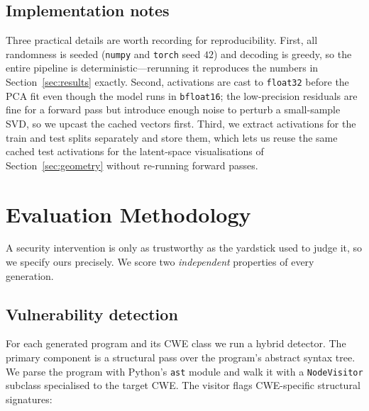 \documentclass[11pt,a4paper]{article}
\begin{document}
\subsection{Implementation notes}
Three practical details are worth recording for reproducibility. First, all randomness is seeded (\texttt{numpy} and \texttt{torch} seed $42$) and decoding is greedy, so the entire pipeline is deterministic---rerunning it reproduces the numbers in Section~\ref{sec:results} exactly. Second, activations are cast to \texttt{float32} before the PCA fit even though the model runs in \texttt{bfloat16}; the low-precision residuals are fine for a forward pass but introduce enough noise to perturb a small-sample SVD, so we upcast the cached vectors first. Third, we extract activations for the train and test splits separately and store them, which lets us reuse the same cached test activations for the latent-space visualisations of Section~\ref{sec:geometry} without re-running forward passes.

\section{Evaluation Methodology}
\label{sec:eval}

A security intervention is only as trustworthy as the yardstick used to judge it, so we specify ours precisely. We score two \emph{independent} properties of every generation.

\subsection{Vulnerability detection}
For each generated program and its CWE class we run a hybrid detector. The primary component is a structural pass over the program's abstract syntax tree. We parse the program with Python's \texttt{ast} module and walk it with a \texttt{NodeVisitor} subclass specialised to the target CWE. The visitor flags CWE-specific structural signatures:
\end{document}

